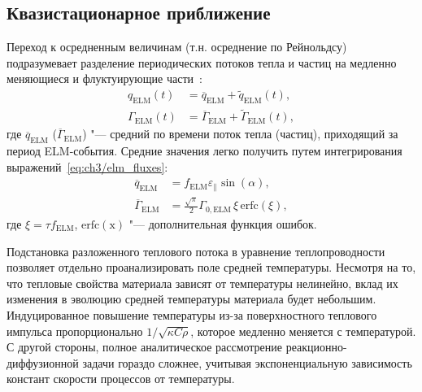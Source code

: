 \subsection{Квазистационарное приближение}
Переход к осредненным величинам (т.н. осреднение по Рейнольдсу) подразумевает разделение периодических потоков тепла и частиц на медленно меняющиеся и флуктуирующие части~\cite{Marenkov2012a}:
\begin{subequations}
	\label{eq:ch3/periodic_funcs}
	\begin{align}
		q_{\mathrm{ELM}}(t)&=\overline{q}_{\mathrm{ELM}} + \widetilde{q}_{\mathrm{ELM}}(t),\label{eq:decomp_heat}\\
		\Gamma_{\mathrm{ELM}}(t)&=\overline{\Gamma}_{\mathrm{ELM}} + \widetilde{\Gamma}_{\mathrm{ELM}}(t),
	\end{align}
\end{subequations}
где $\overline{q}_{\mathrm{ELM}}$ ($\overline{\Gamma}_{\mathrm{ELM}}$) "--- средний по времени поток тепла (частиц), приходящий за период ELM-события. Средние значения легко получить путем интегрирования выражений~\cref{eq:ch3/elm_fluxes}:
\begin{subequations}
	\label{eq:ch3/av_funcs}
	\begin{align}
		\overline{q}_{\mathrm{ELM}}&=f_{\mathrm{ELM}}\varepsilon_\parallel\sin(\alpha)\label{eq:av_heat},\\
		\overline{\Gamma}_{\mathrm{ELM}}& =\frac{\sqrt{\pi}}{2} \Gamma_{0,\mathrm{ELM}}\,\xi\,\mathrm{erfc}\left(\xi\right),\label{eq:av_flux}
	\end{align}
\end{subequations}
где $\xi=\tau f_{\mathrm{ELM}}$, $\mathrm{erfc(x)}$ "--- дополнительная функция ошибок.

Подстановка разложенного теплового потока в уравнение теплопроводности позволяет отдельно проанализировать поле средней температуры. Несмотря на то, что тепловые свойства материала зависят от температуры нелинейно, вклад их изменения в эволюцию средней температуры материала будет небольшим. Индуцированное повышение температуры из-за поверхностного теплового импульса пропорционально $1/\sqrt{\kappa C \rho}$, которое медленно меняется с температурой. С другой стороны, полное аналитическое рассмотрение реакционно-диффузионной задачи гораздо сложнее, учитывая экспоненциальную зависимость констант скорости процессов от температуры.

\begin{comment}
	 В случае переноса тепла требуем: \( \underset{t}{\max} \, |\widetilde{q}_{\mathrm{ELM}}| \ll \overline{q}_{\mathrm{tot}} \), где \( \overline{q}_{\mathrm{tot}} = q_\mathrm{stat} + \overline{q}_{\mathrm{ELM}} \). Для задачи транспорта дейтерия необходимо, чтобы амплитуда изменения флуктуирующей части объемного источника атомов была мала: \( \underset{t}{\max} \, |\widetilde{S}_{\mathrm{ELM}}| \ll \overline{S}_{\mathrm{tot}} \), где \( \overline{S}_{\mathrm{tot}} = S_\mathrm{stat} + \overline{S}_{\mathrm{ELM}} \).
\end{comment}

